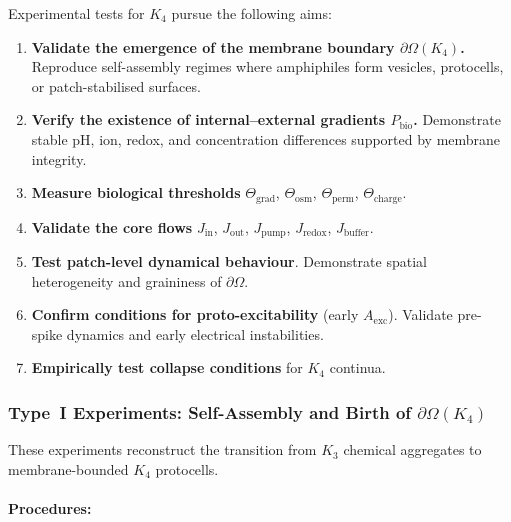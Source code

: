 Experimental tests for $K_4$ pursue the following aims:

\begin{enumerate}
    \item \textbf{Validate the emergence of the membrane boundary
          $\partial\Omega(K_4)$.}
          Reproduce self-assembly regimes where amphiphiles form vesicles,
          protocells, or patch-stabilised surfaces.

    \item \textbf{Verify the existence of internal--external gradients
          $P_{\mathrm{bio}}$.}
          Demonstrate stable pH, ion, redox, and concentration
          differences supported by membrane integrity.

    \item \textbf{Measure biological thresholds} $\Theta_{\mathrm{grad}}$,
          $\Theta_{\mathrm{osm}}$, $\Theta_{\mathrm{perm}}$,
          $\Theta_{\mathrm{charge}}$.

    \item \textbf{Validate the core flows}
          $J_{\mathrm{in}}$, $J_{\mathrm{out}}$, $J_{\mathrm{pump}}$,
          $J_{\mathrm{redox}}$, $J_{\mathrm{buffer}}$.

    \item \textbf{Test patch-level dynamical behaviour}.
          Demonstrate spatial heterogeneity and graininess of $\partial\Omega$.

    \item \textbf{Confirm conditions for proto-excitability} (early $A_{\mathrm{exc}}$).
          Validate pre-spike dynamics and early electrical instabilities.

    \item \textbf{Empirically test collapse conditions} for $K_4$ continua.
\end{enumerate}



\subsubsection{Type~I Experiments: Self-Assembly and Birth of \texorpdfstring{$\partial\Omega(K_4)$}{\partial\Omega(K_4)}}

These experiments reconstruct the transition from $K_3$ chemical
aggregates to membrane-bounded $K_4$ protocells.

\paragraph{Procedures:}

